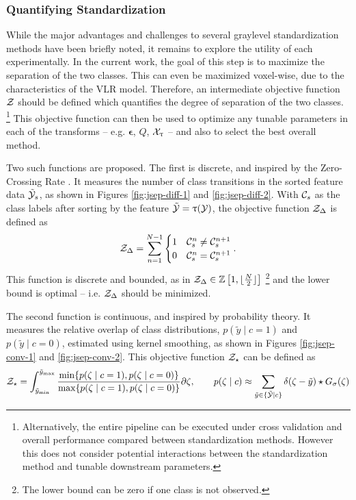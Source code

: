 \subsubsection{Quantifying Standardization}
While the major advantages and challenges to several graylevel standardization methods have been briefly noted, it remains to explore the utility of each experimentally.
In the current work, the goal of this step is to maximize the separation of the two classes.
This can even be maximized voxel-wise, due to the characteristics of the VLR model.
Therefore, an intermediate objective function $\mathcal{Z}$ should be defined which quantifies the degree of separation of the two classes.%
\footnote{Alternatively, the entire pipeline can be executed under cross validation and overall performance compared between standardization methods.
However this does not consider potential interactions between the standardization method and tunable downstream parameters.}
This objective function can then be used to optimize any tunable parameters in each of the transforms -- e.g. $\bm{\epsilon}$, $Q$, $\mathcal{X}_{\uptau}$ -- and also to select the best overall method.
\par
Two such functions are proposed.
The first is discrete, and inspired by the Zero-Crossing Rate \cite{Kedem1986}.
It measures the number of class transitions in the sorted feature data $\tilde{\mathcal{Y}}_s$, as shown in Figures \ref{fig:jsep-diff-1} and \ref{fig:jsep-diff-2}.
With $\mathcal{C}_s$ as the class labels after sorting by the feature $\tilde{\mathcal{Y}} = \uptau(\mathcal{Y})$, the objective function $\mathcal{Z}_{\Delta}$ is defined as
\begin{equation}
\mathcal{Z}_{\Delta} = \sum_{n=1}^{N-1}\begin{cases}
1&\mathcal{C}_s^{n} \ne \mathcal{C}_s^{n+1}\\
0&\mathcal{C}_s^{n}  =  \mathcal{C}_s^{n+1}
\end{cases}.
\end{equation}
This function is discrete and bounded, as in $\mathcal{Z}_{\Delta}\in\mathbb{Z}\left[1,\lfloor\frac{N}{2}\rfloor\right]$%
\footnote{The lower bound can be zero if one class is not observed.}
and the lower bound is optimal -- i.e. $\mathcal{Z}_{\Delta}$ should be minimized.
\par
The second function is continuous, and inspired by probability theory.
It measures the relative overlap of class distributions, $p(\tilde{y}\mid c=1)$ and $p(\tilde{y}\mid c=0)$, estimated using kernel smoothing, as shown in Figures \ref{fig:jsep-conv-1} and \ref{fig:jsep-conv-2}.
This objective function $\mathcal{Z}_{\star}$ can be defined as
\begin{equation}
\mathcal{Z}_{\star} = \int_{\tilde{y}_{\min}}^{\tilde{y}_{\max}}
\frac{\min\{p(\zeta \mid c=1), p(\zeta \mid c=0)\}}
     {\max\{p(\zeta \mid c=1), p(\zeta \mid c=0)\}}\partial\zeta,
\qquad p(\zeta \mid c) \approx \sum_{\tilde{y}\in\{\tilde{\mathcal{Y}}\mid c\}}\delta(\zeta-\tilde{y}) \star G_{\sigma}(\zeta)
\end{equation}
